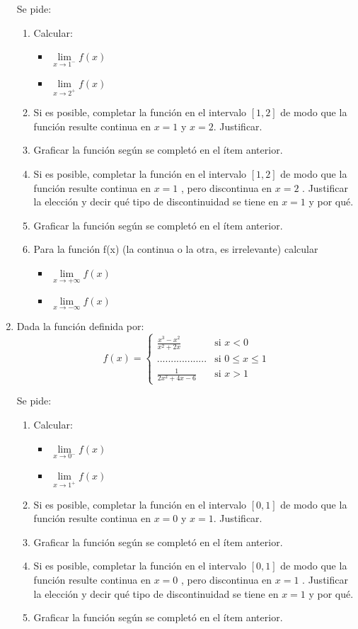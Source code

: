 \documentclass[12pt]{article}
\theoremstyle{definition}
\begin{document}
\begin{enumerate}
Se pide:

\begin{enumerate}
	\item Calcular:
		\begin{itemize}
			\item  $\lim\limits_{x \to 1^-} f(x) $
			\item  $\lim\limits_{x \to 2^+} f(x) $
		\end{itemize}
		\item Si es posible, completar la función en el intervalo $[1,2]$ de modo que la función resulte continua en $x =1$ y $x =2$. Justificar. 
	\item Graficar la función según se completó en el ítem anterior.
	\item Si es posible, completar la función en el intervalo $[1,2]$ de modo que la función resulte continua en $x =1$ , pero discontinua en $x =2$ . Justificar la elección y decir qué tipo de discontinuidad se tiene en $x =1$ y por qué.
	\item Graficar la función según se completó en el ítem anterior.
	\item Para la función f(x) (la continua o la otra, es irrelevante) calcular
		\begin{itemize}
			\item  $\lim\limits_{x \to +\infty} f(x) $
			\item  $\lim\limits_{x \to -\infty} f(x) $
		\end{itemize}
\end{enumerate}

\item  
Dada la función definida por:
\begin{equation*}
	f(x) = 
	\begin{cases} 
		\frac{x^3-x^2}{x^2+2x}  & \text{si  } x < 0 \\
		..................& \text{si   } 0 \leq x \leq 1\\
		\frac{1}{2x^2+4x-6}  & \text{si  } x > 1
	\end{cases}
\end{equation*}

Se pide:
\begin{enumerate}
	\item Calcular:
		\begin{itemize}
			\item  $\lim\limits_{x \to 0^-} f(x) $
			\item  $\lim\limits_{x \to 1^+} f(x) $
			\end{itemize}
	\item Si es posible, completar  la función en el intervalo $[0,1]$ de modo que la función resulte continua en $x = 0$ y $x =1$. Justificar. 
	\item Graficar la función según se completó en el ítem anterior.
	\item Si es posible, completar  la función en el intervalo $[0,1]$ de modo que la función resulte continua en $x = 0$ , pero discontinua en $x =1$ . Justificar la elección y decir qué tipo de discontinuidad se tiene en $x =1$ y por qué.
	\item Graficar la función según se completó en el ítem anterior.
\end{enumerate}


\end{enumerate}
\end{document}
